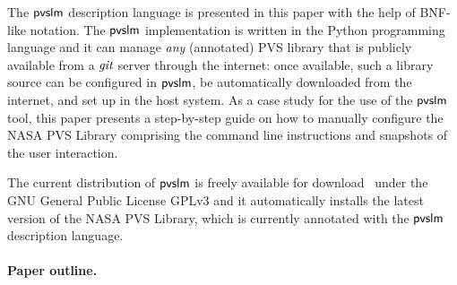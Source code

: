 The $\textsf{pvslm}$ description language is presented in this paper with the
help of BNF-like notation. The $\textsf{pvslm}$ implementation is written in
the Python programming language and it can manage {\em any}
(annotated) PVS library that is publicly available from a $\textit{git}$
server through the internet: once available, such a library source can
be configured in $\textsf{pvslm}$, be automatically downloaded from the
internet, and set up in the host system. As a case study for the use
of the $\textsf{pvslm}$ tool, this paper presents a step-by-step guide on how
to manually configure the NASA PVS Library comprising the command line
instructions and snapshots of the user interaction.

The current distribution of $\textsf{pvslm}$ is freely available for
download~\cite{pvslm} under the GNU General Public License GPLv3 and
it automatically installs the latest version of the NASA PVS Library,
which is currently annotated with the $\textsf{pvslm}$ description language.

\paragraph{Paper outline.}
